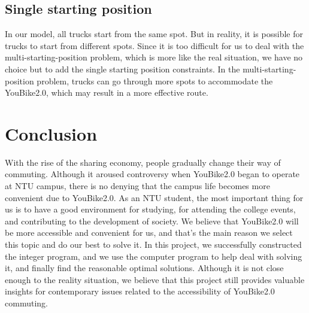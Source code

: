 \documentclass[12pt,a4paper]{article}
\begin{document}
\subsection{Single starting position}
In our model, all trucks start from the same spot. But in reality, it is possible for trucks to start from different spots. Since it is too difficult for us to deal with the multi-starting-position problem, which is more like the real situation, we have no choice but to add the single starting position constraints. In the multi-starting-position problem, trucks can go through more spots to accommodate the YouBike2.0, which may result in a more effective route.


\section{Conclusion}

With the rise of the sharing economy, people gradually change their way of commuting. Although it aroused controversy when YouBike2.0 began to operate at NTU campus, there is no denying that the campus life becomes more convenient due to YouBike2.0. As an NTU student, the most important thing for us is to have a good environment for studying, for attending the college events, and contributing to the development of society. We believe that YouBike2.0 will be more accessible and convenient for us, and that's the main reason we select this topic and do our best to solve it. In this project, we successfully constructed the integer program, and we use the computer program to help deal with solving it, and finally find the reasonable optimal solutions. Although it is not close enough to the reality situation, we believe that this project still provides valuable insights for contemporary issues related to the accessibility of YouBike2.0 commuting.  
\end{document}
